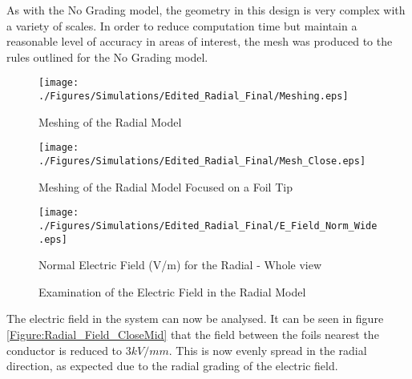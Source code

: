 As with the No Grading model, the geometry in this design is very complex with a variety of scales.
In order to reduce computation time but maintain a reasonable level of accuracy in areas of interest, the mesh was produced to the rules outlined for the No Grading model.
\begin{figure}[!h]
  \centering
    \texttt{[image: ./Figures/Simulations/Edited\_Radial\_Final/Meshing.eps]} 
	\caption{Meshing of the Radial Model}
	\label{Figure:Radial_Mesh_wide}
\end{figure}

\begin{figure}[!h]
  \centering
    \texttt{[image: ./Figures/Simulations/Edited\_Radial\_Final/Mesh\_Close.eps]} 
	\caption{Meshing of the Radial Model Focused on a Foil Tip}
	\label{Figure:Radial_Mesh_close}
\end{figure}


\begin{figure}[!h]
  \centering
    \texttt{[image: ./Figures/Simulations/Edited\_Radial\_Final/E\_Field\_Norm\_Wide.eps]} 
	\caption{Normal Electric Field (V/m) for the Radial - Whole view}
	\label{Figure:Radial_Field_Wide}
   \end{figure}

\begin{figure}[!h]
  \centering
{} 
\caption{Examination of the Electric Field in the Radial Model}
\label{Figure:No_Grading_Field}
\end{figure}

The electric field in the system can now be analysed.
It can be seen in figure \ref{Figure:Radial_Field_CloseMid} that the field between the foils nearest the conductor is reduced to $3kV/mm$.
This is now evenly spread in the radial direction, as expected due to the radial grading of the electric field.

